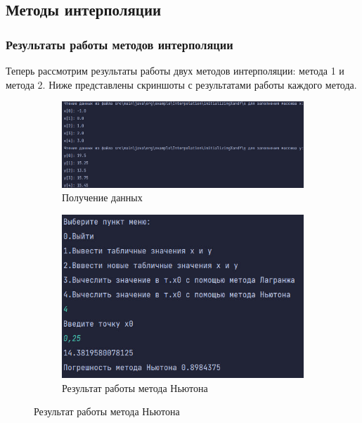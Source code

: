 \documentclass[12pt]{article}
\begin{document}
\subsection{Методы интерполяции}

\subsubsection{Результаты работы методов интерполяции}

Теперь рассмотрим результаты работы двух методов интерполяции: метода 1 и метода 2. Ниже представлены скриншоты с результатами работы каждого метода.

\clearpage

\begin{figure}[ht]
\centering
\begin{subfigure}{0.4\textwidth}
\includegraphics[width=\linewidth]{method_interpolation_Input.png}
\caption{Получение данных}
\end{subfigure}
\hfill
\begin{subfigure}{0.4\textwidth}
\includegraphics[width=\linewidth]{method_interpolation_Newton.png}
\caption{Результат работы метода Ньютона}
\end{subfigure}

\end{figure}
\end{document}
